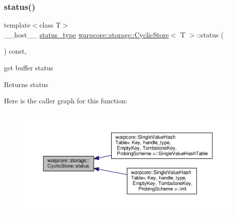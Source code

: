 \subsubsection{\texorpdfstring{status()}{status()}}
{\footnotesize\ttfamily template$<$class T$>$ \\
\+\_\+\+\_\+host\+\_\+\+\_\+ \hyperlink{classwarpcore_1_1Status}{status\+\_\+type} \hyperlink{classwarpcore_1_1storage_1_1CyclicStore}{warpcore\+::storage\+::\+Cyclic\+Store}$<$ T $>$\+::status (\begin{DoxyParamCaption}{ }\end{DoxyParamCaption}) const\hspace{0.3cm}{\ttfamily [inline]}, {\ttfamily [noexcept]}}



get buffer status 

\begin{DoxyReturn}{Returns}
status 
\end{DoxyReturn}
Here is the caller graph for this function\+:
\nopagebreak
\begin{figure}[H]
\begin{center}
\leavevmode
\includegraphics[width=350pt]{classwarpcore_1_1storage_1_1CyclicStore_ab6c224b2b5a49d93dc7e052ec7b8cc32_icgraph}
\end{center}
\end{figure}
